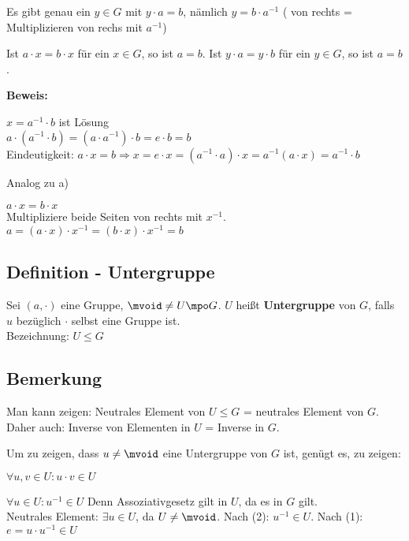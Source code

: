 		\item Es gibt genau ein $y\in G$ mit $y\cdot a=b$, nämlich $y=b\cdot a^{-1}$ ( von rechts = Multiplizieren von rechs mit $a^{-1}$)
		
		\item Ist $a\cdot x=b\cdot x$ für ein $x\in G$, so ist $a=b$. Ist $y\cdot a=y\cdot b$ für ein $y\in G$, so ist $a=b$.
	\subExEnd
	
	\textbf{Beweis:}
		\item $x=a^{-1}\cdot b$ ist Lösung\\
		$a\cdot(a^{-1}\cdot b)=(a\cdot a^{-1})\cdot b=e\cdot b=b$\\
		Eindeutigkeit: $a\cdot x=b\Rightarrow x=e\cdot x=(a^{-1}\cdot a)\cdot x=a^{-1}(a\cdot x)=a^{-1}\cdot b$
		
		\item Analog zu a)
		\item $a\cdot x=b\cdot x$\\
		Multipliziere beide Seiten von rechts mit $x^{-1}$. $a=(a\cdot x)\cdot x^{-1}=(b\cdot x)\cdot x^{-1}=b$
	\subExEnd
	
	\subsection{Definition - Untergruppe}
	
	Sei $(a,\cdot)$ eine Gruppe, $\mvoid\neq U\mpo G$. $U$ heißt \textbf{Untergruppe} von $G$, falls $u$ bezüglich $\cdot$ selbst eine Gruppe ist.\\
	Bezeichnung: $U\leq G$
	
	\subsection{Bemerkung}
	
		\item Man kann zeigen: Neutrales Element von $U\leq G$ = neutrales Element von $G$. Daher auch: Inverse von Elementen in $U$ = Inverse in $G$.
		\item Um zu zeigen, dass $u\neq\mvoid$ eine Untergruppe von $G$ ist, genügt es, zu zeigen:
			\item $\forall u,v\in U:u\cdot v\in U$
			\item $\forall u\in U: u^{-1}\in U$
		\subExEnd
		Denn Assoziativgesetz gilt in $U$, da es in $G$ gilt.\\
		Neutrales Element: $\exists u\in U$, da $U\neq\mvoid$. Nach (2): $u^{-1}\in U$. Nach (1): $e=u\cdot u^{-1}\in U$
	\subExEnd
	
